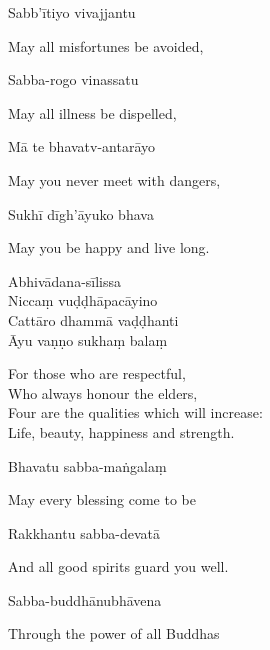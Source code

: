 
Sabb'ītiyo vivajjantu

\begin{cprenglish}
  May all misfortunes be avoided,
\end{cprenglish}

Sabba-rogo vinassatu

\begin{cprenglish}
  May all illness be dispelled,
\end{cprenglish}

Mā te bhavatv-antarāyo

\begin{cprenglish}
  May you never meet with dangers,
\end{cprenglish}

Sukhī dīgh'āyuko bhava

\begin{cprenglish}
  May you be happy and live long.
\end{cprenglish}

Abhivādana-sīlissa\\
Niccaṃ vuḍḍhāpacāyino\\
Cattāro dhammā vaḍḍhanti\\
Āyu vaṇṇo sukhaṃ balaṃ

\begin{cprenglish}
  For those who are respectful,\\
  Who always honour the elders,\\
  Four are the qualities which will increase:\\
  Life, beauty, happiness and strength. 
\end{cprenglish}


Bhavatu sabba-maṅgalaṃ

\begin{cprenglish}
  May every blessing come to be
\end{cprenglish}

Rakkhantu sabba-devatā

\begin{cprenglish}
  And all good spirits guard you well.
\end{cprenglish}

Sabba-buddhānubhāvena

\begin{cprenglish}
  Through the power of all Buddhas
\end{cprenglish}

